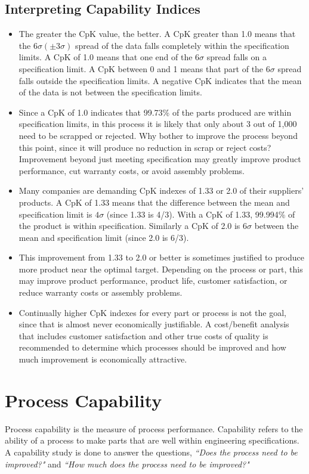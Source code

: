 \documentclass[MASTER-SPC.tex]{subfiles}
\begin{document}
\subsection{Interpreting Capability Indices}
\begin{itemize}
	\item The greater the CpK value, the better. A CpK greater than 1.0 means that the $6\sigma  (\pm 3\sigma)$ spread of the data falls completely within the specification limits. A CpK of 1.0 means that one end of the $6\sigma$ spread falls on a specification limit. A CpK between 0 and 1 means that part of the $6\sigma$  spread falls outside the specification limits. A negative CpK indicates that the mean of the data is not between the specification limits.
	
	\item Since a CpK of 1.0 indicates that 99.73\% of the parts produced are within specification limits, in this process it is likely that only about 3 out of 1,000 need to be scrapped or rejected. Why bother to improve the process beyond this point, since it will produce no reduction in scrap or reject costs? Improvement beyond just meeting specification may greatly improve product performance, cut warranty costs, or avoid assembly problems.
	
	\item
	Many companies are demanding CpK indexes of 1.33 or 2.0 of their suppliers’ products. A CpK of 1.33 means that the difference between the mean and specification limit is $4\sigma$  (since 1.33 is 4/3). With a CpK of 1.33, 99.994\% of the product is within specification. Similarly a CpK of 2.0 is $6\sigma$  between the mean and specification limit (since 2.0 is 6/3). 
	\item 
	This improvement from 1.33 to 2.0 or better is sometimes justified to produce more product near the optimal target. Depending on the process or part, this may improve product performance, product life, customer satisfaction, or reduce warranty costs or assembly problems.
	\item
	Continually higher CpK indexes for every part or process is not the goal, since that is almost never economically justifiable. A cost/benefit analysis that includes customer satisfaction and other true costs of quality is recommended to determine which processes should be improved and how much improvement is economically attractive.
\end{itemize}
\newpage
\section{Process Capability}
Process capability is the measure of process performance. Capability refers to the ability of a process to make parts that are well within engineering specifications. A capability study is done to answer the questions, \textit{``Does the process need to be improved?"} and  \textit{``How much does the process need to be improved?"}
\end{document}

